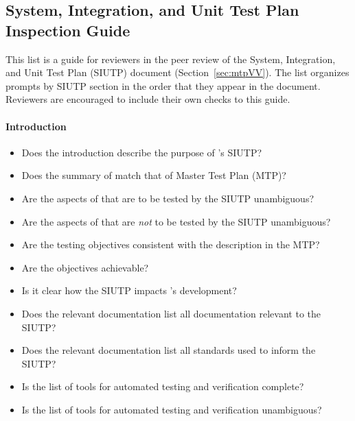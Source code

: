 \subsection{System, Integration, and Unit Test Plan Inspection
Guide}\label{appendix:siutpInspection}
This list is a guide for reviewers in the peer review of the System,
Integration, and Unit Test Plan (SIUTP) document (Section~\ref{sec:mtpVV}). The
list organizes prompts by SIUTP section in the order that they appear in the
document. Reviewers are encouraged to include their own checks to this guide.

\paragraph{Introduction}
\begin{itemize}

    \item Does the introduction describe the purpose of \progname{}'s SIUTP?

    \item Does the summary of \progname{} match that of Master Test Plan (MTP)?

    \item Are the aspects of \progname{} that are to be tested by the SIUTP
    unambiguous?

    \item Are the aspects of \progname{} that are \textit{not} to be tested by
    the SIUTP unambiguous?

    \item Are the testing objectives consistent with the description in the MTP?

    \item Are the objectives achievable?

    \item Is it clear how the SIUTP impacts \progname{}'s development?

    \item Does the relevant documentation list all \progname{} documentation
    relevant to the SIUTP?

    \item Does the relevant documentation list all standards used to inform the
    SIUTP?

    \item Is the list of tools for automated testing and verification complete?

    \item Is the list of tools for automated testing and verification
    unambiguous?

\end{itemize}

